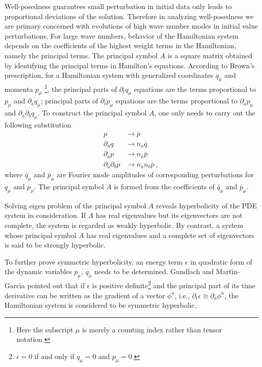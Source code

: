Well-posedness guarantees small perturbation in initial data only leads to proportional deviations of the solution. Therefore in analyzing well-posedness we are primary concerned with evolutions of high wave number modes in initial value perturbations. For large wave numbers, behavior of the Hamiltonian system depends on the coefficients of the highest weight terms in the Hamiltonian, namely the principal terms. The principal symbol $A$ is a square matrix obtained by identifying the principal terms in Hamilton's equations. According to Brown's prescription\cite{Brown:2008cca}, for a Hamiltonian system with generalized coordinates $q_{\mu}$ and momenta $p_{\mu}$ \footnote{Here the subscript $\mu$ is merely a counting index rather than tensor notation.}, the principal parts of $\partial_{t}q_{\mu}$ equations are the terms proportional to $p_{\mu}$ and $\partial_{a}q_{\mu}$; principal parts of $\partial_{t}p_{\mu}$ equations are the terms proportional to $\partial_{a}p_{\mu}$ and $\partial_{a}\partial_{b}q_{\mu}$. To construct the principal symbol $A$, one only needs to carry out the following substitution
\begin{subequations}\label{substitution}
\begin{align}
p & \rightarrow {\bar p}\\
\partial_{a}q &\rightarrow n_{a}{\bar q}\\
\partial_{a}p & \rightarrow n_{a}{\bar p}\\
\partial_{a}\partial_{b}p & \rightarrow n_{a}n_{b}{\bar p} \ ,
\end{align}
\end{subequations}
where ${\bar q}_{\mu}$ and ${\bar p}_{\mu}$ are Fourier mode amplitudes of corresponding perturbations for $q_{\mu}$ and $p_{\mu}$. The principal symbol $A$ is formed from the coefficients of ${\bar q}_{\mu}$ and ${\bar p}_{\mu}$. 

Solving eigen problem of the principal symbol $A$ reveals hyperbolicity of the PDE system in consideration. If $A$ has real eigenvalues but its eigenvectors are not complete, the system is regarded as weakly hyperbolic. By contrast, a system whose principal symbol $A$ has real eigenvalues and a complete set of eigenvectors is said to be strongly hyperbolic. 

To further prove symmetric hyperbolicity, an energy term $\epsilon$ in quadratic form of the dynamic variables $p_{\mu}$, $q_{\mu}$ needs to be determined. Gundlach and Mart\' \i n-Garc\' \i a\cite{Gundlach:2005ta} pointed out that if $\epsilon$ is positive definite\footnote{$\epsilon = 0$ if and only if $q_{\mu} = 0$ and $p_{\mu} = 0$.} and the principal part of its time derivative can be written as the gradient of a vector $\phi^{a}$, i.e., $\partial_{t}\epsilon \cong \partial_{a}\phi^{a}$, the Hamiltonian system is considered to be symmetric hyperbolic. 

